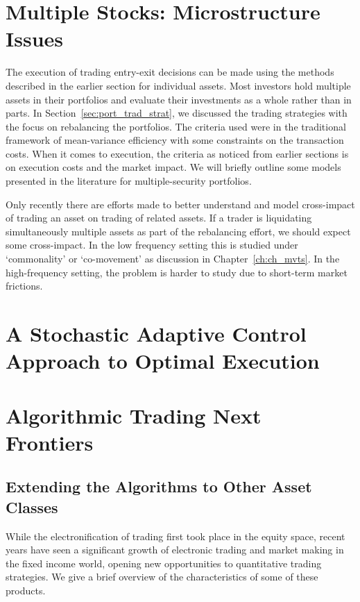 \section{Multiple Stocks: Microstructure Issues}

The execution of trading entry-exit decisions can be made using the methods described in the earlier section for individual assets. Most investors hold multiple assets in their portfolios and evaluate their investments as a whole rather than in parts. In Section~\ref{sec:port_trad_strat}, we discussed the trading strategies with the focus on rebalancing the portfolios. The criteria used were in the traditional framework of mean-variance efficiency with some constraints on the transaction costs. When it comes to execution, the criteria as noticed from earlier sections is on execution costs and the market impact. We will briefly outline some models presented in the literature for multiple-security portfolios.


Only recently there are efforts made to better understand and model cross-impact of trading an asset on trading of related assets. If a trader is liquidating simultaneously multiple assets as part of the rebalancing effort, we should expect some cross-impact. In the low frequency setting this is studied under `commonality' or `co-movement' as discussion in Chapter~\ref{ch:ch_mvts}. In the high-frequency setting, the problem is harder to study due to short-term market frictions. 

\section{A Stochastic Adaptive Control Approach to Optimal Execution}
\section{Algorithmic Trading Next Frontiers}
\subsection{Extending the Algorithms to Other Asset Classes}

While the electronification of trading first took place in the equity space, recent years have seen a significant growth of electronic trading and market making in the fixed income world, opening new opportunities to quantitative trading strategies. We give a brief overview of the characteristics of some of these products.\\


